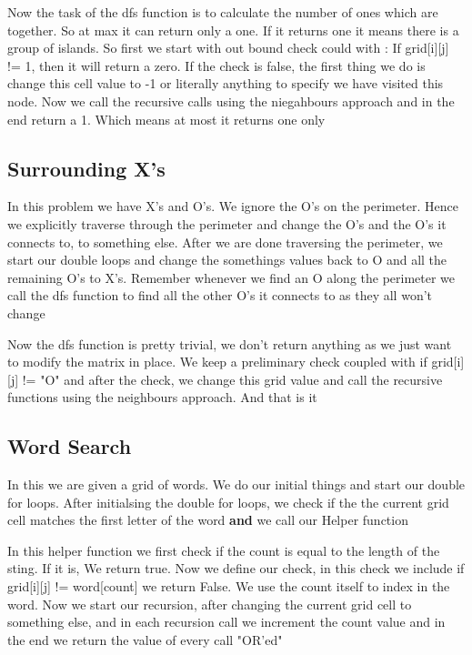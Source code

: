 \documentclass{article}
\newcommand{\nd}{\noindent}
\begin{document}
\nd Now the task of the dfs function is to calculate the number of ones which are together. So at max it can return only a one. If it returns one it means there is a group of islands. So first we start with out bound check could with : If grid[i][j] != 1, then it will return a zero. If the check is false, the first thing we do is change this cell value to -1 or literally anything to specify we have visited this node. Now we call the recursive calls using the niegahbours approach and in the end return a 1. Which means at most it returns one only 

\subsection{Surrounding X's}
In this problem we have X's and O's. We ignore the O's on the perimeter. Hence we explicitly traverse through the perimeter and change the O's and the O's it connects to, to something else. After we are done traversing the perimeter, we start our double loops and change the somethings values back to O and all the remaining O's to X's. Remember whenever we find an O along the perimeter we call the dfs function to find all the other O's it connects to as they all won't change 

\nd Now the dfs function is pretty trivial, we don't return anything as we just want to modify the matrix in place. We keep a preliminary check coupled with if grid[i][j] != "O" and after the check, we change this grid value and call the recursive functions using the neighbours approach. And that is it 

\subsection{Word Search}
In this we are given a grid of words. We do our initial things and start our double for loops. After initialsing the double for loops, we check if the the current grid cell matches the first letter of the word \textbf{and} we call our Helper function

\nd In this helper function we first check if the count is equal to the length of the sting. If it is, We return true. Now we define our check, in this check we include if grid[i][j] != word[count] we return False. We use the count itself to index in the word. Now we start our recursion, after changing the current grid cell to something else, and in each recursion call we increment the count value and in the end we return the value of every call "OR'ed"
\end{document}
